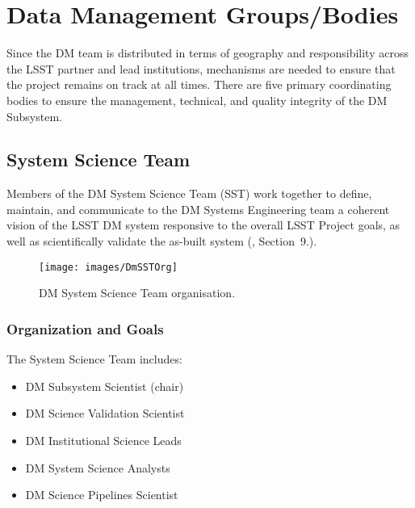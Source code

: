 \section{Data Management Groups/Bodies} \label{sect:groups}

Since the DM team is distributed in terms of geography and responsibility across the LSST partner and lead institutions, mechanisms are needed to ensure that the project remains on track at all times. There are five primary coordinating bodies to ensure the management, technical, and quality integrity of the DM Subsystem.

\subsection{System Science Team \label{sect:dmsst}}

Members of the DM System Science Team (SST) work together to define, maintain, and communicate to the DM Systems Engineering team a coherent vision of the LSST DM system responsive to the overall LSST Project goals, as well as scientifically validate the as-built system (, Section~9.).

\begin{figure}[htbp]
\begin{center}
\texttt{[image: images/DmSSTOrg]}
\caption{DM System Science Team organisation.
\label{fig:sstorg}}
\end{center}
\end{figure}



\subsubsection{Organization and Goals}

The System Science Team includes:
\begin{itemize}
\item DM Subsystem Scientist (chair)
\item DM Science Validation Scientist
\item DM Institutional Science Leads
\item DM System Science Analysts
\item DM Science Pipelines Scientist
\end{itemize}

